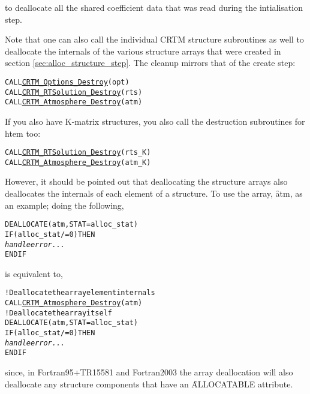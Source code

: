 to deallocate all the shared coefficient data that was read during the intialisation step.

Note that one can also call the individual CRTM structure subroutines as well to deallocate the internals of the various structure arrays that were created in section \ref{sec:alloc_structure_step}. The cleanup mirrors that of the create step:

\begin{alltt}
  CALL \hyperref[sec:CRTM_Options_Destroy_interface]{CRTM_Options_Destroy}(opt)
  CALL \hyperref[sec:CRTM_RTSolution_Destroy_interface]{CRTM_RTSolution_Destroy}(rts)
  CALL \hyperref[sec:CRTM_Atmosphere_Destroy_interface]{CRTM_Atmosphere_Destroy}(atm)\end{alltt}

If you also have K-matrix structures, you also call the destruction subroutines for htem too:

\begin{alltt}
  CALL \hyperref[sec:CRTM_RTSolution_Destroy_interface]{CRTM_RTSolution_Destroy}(rts_K)
  CALL \hyperref[sec:CRTM_Atmosphere_Destroy_interface]{CRTM_Atmosphere_Destroy}(atm_K)\end{alltt}

However, it should be pointed out that deallocating the structure arrays also deallocates the internals of each element of a structure. To use the \hyperref[sec:atmosphere_structure]{\Atmosphere} array, \f{atm}, as an example; doing the following,

\begin{alltt}
  DEALLOCATE( atm, STAT = alloc_stat )
  IF ( alloc_stat /= 0 ) THEN
    \textrm{\textit{handle error...}}
  END IF\end{alltt}
  
is equivalent to,

\begin{alltt}
  ! Deallocate the array element internals
  CALL \hyperref[sec:CRTM_Atmosphere_Destroy_interface]{CRTM_Atmosphere_Destroy}(atm)
  ! Deallocate the array itself
  DEALLOCATE( atm, STAT = alloc_stat )
  IF ( alloc_stat /= 0 ) THEN
    \textrm{\textit{handle error...}}
  END IF\end{alltt}

since, in Fortran95+TR15581 and Fortran2003 the array deallocation will also deallocate any structure components that have an \f{ALLOCATABLE} attribute.

